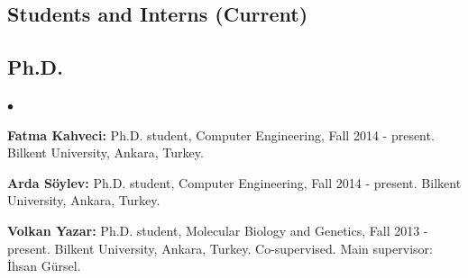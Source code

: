\documentclass[margin,line]{res}
\newenvironment{list2}{
  \begin{list}{$\bullet$}{%
      \setlength{\itemsep}{0in}
      \setlength{\parsep}{0in} \setlength{\parskip}{0in}
      \setlength{\topsep}{0in} \setlength{\partopsep}{0in} 
      \setlength{\leftmargin}{0.2in}}}{\end{list}}
\begin{document}
\begin{resume}
\section{\sc Students and Interns (Current)}
\vspace*{-.4cm}
\subsection{\small \sc Ph.D.}
\begin{list2}
\item
  {\bf Fatma Kahveci:} Ph.D. student, Computer Engineering, Fall 2014 - present.
  Bilkent University, Ankara, Turkey.
\item
  {\bf Arda Söylev:} Ph.D. student, Computer Engineering, Fall 2014 - present.
  Bilkent University, Ankara, Turkey. 
\item
  {\bf Volkan Yazar:} Ph.D. student, Molecular Biology and Genetics, Fall 2013 - present.
  Bilkent University, Ankara, Turkey. Co-supervised. Main supervisor: İhsan Gürsel.
\end{list2}
\vspace*{-.4cm}

\end{resume}
\end{document}
